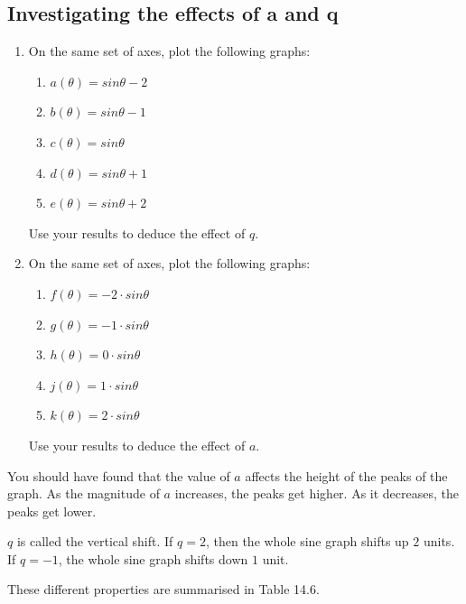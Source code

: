 \subsection*{Investigating the effects of a and q}
\nopagebreak
\begin{enumerate}[noitemsep, label=\textbf{\arabic*}. ] 
\item On the same set of axes, plot the following graphs:
\begin{enumerate}[noitemsep, label=\textbf{\alph*}. ] 
\item $a(\theta )=sin\theta -2$
\item $b(\theta )=sin\theta -1$
\item $c(\theta )=sin\theta $
\item $d(\theta )=sin\theta +1$
\item $e(\theta )=sin\theta +2$
\end{enumerate}
Use your results to deduce the effect of $q$.
\item On the same set of axes, plot the following graphs:
\begin{enumerate}[noitemsep, label=\textbf{\alph*}. ] 
\item $f(\theta )=-2\ensuremath{\cdot}sin\theta $
\item $g(\theta )=-1\ensuremath{\cdot}sin\theta $
\item $h(\theta )=0\ensuremath{\cdot}sin\theta $
\item $j(\theta )=1\ensuremath{\cdot}sin\theta $
\item $k(\theta )=2\ensuremath{\cdot}sin\theta $\end{enumerate}
Use your results to deduce the effect of $a$.
\end{enumerate}
You should have found that the value of $a$ affects the height of the peaks of the graph. As the magnitude of $a$ increases, the peaks get higher. As it decreases, the peaks get lower.\par 
$q$ is called the vertical shift. If $q=2$, then the whole sine graph shifts up $2$ units. If $q=-1$, the whole sine graph shifts down $1$ unit.\par 
These different properties are summarised in Table 14.6.\par 
